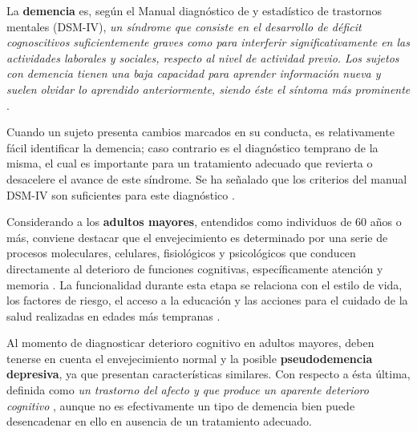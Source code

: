 La \textbf{demencia} es, según el Manual diagnóstico de y estadístico de trastornos mentales
(DSM-IV), \textit{un síndrome que consiste en el desarrollo de déficit cognoscitivos
suficientemente graves como para interferir significativamente en las actividades laborales 
y sociales, respecto al nivel de actividad previo. 
Los sujetos con demencia tienen una baja capacidad para aprender información nueva y 
suelen olvidar lo aprendido anteriormente, siendo éste el síntoma más prominente} \cite{DCM_5}.

Cuando un sujeto presenta cambios marcados en su conducta, es relativamente fácil identificar
la demencia; caso contrario es el diagnóstico temprano de la misma, el cual es importante
para un tratamiento adecuado que 
revierta o desacelere el avance de este síndrome.
Se ha señalado que los criterios del manual DSM-IV son suficientes para este diagnóstico
\cite{Knopman01}.


Considerando a los \textbf{adultos mayores}, entendidos como individuos de 60 años o más,
conviene destacar que el
envejecimiento es determinado por una serie de procesos moleculares, celulares, fisiológicos y 
psicológicos que conducen directamente al deterioro de funciones cognitivas, específicamente 
atención y memoria \cite{Navarrete03,Park09}.
La funcionalidad durante esta etapa se relaciona con el estilo de vida, los factores de riesgo, el 
acceso a la educación y las acciones para el cuidado de la salud realizadas en edades más 
tempranas \cite{Ohayon04,Sanhueza14}.


Al momento de diagnosticar deterioro cognitivo en adultos mayores, deben tenerse en cuenta
el envejecimiento normal y la posible \textbf{pseudodemencia depresiva}, ya que presentan
características similares. Con respecto a ésta última, definida como \textit{un
trastorno del afecto y que produce un aparente deterioro cognitivo} \cite{DCM_5},
aunque no es efectivamente un tipo de demencia bien puede desencadenar en ello
en ausencia de un tratamiento adecuado.

